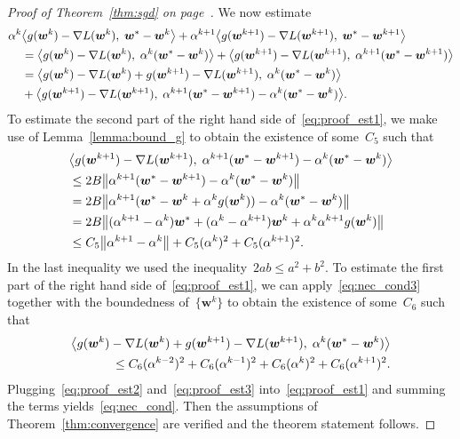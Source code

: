 \begin{proof}[Proof of Theorem~\ref{thm:sgd} on page~\pageref{thm:sgd}]
  We now estimate
  \begin{equation}\label{eq:proof_est1}
    \begin{aligned}
      \alpha^k
      & \inner{ g(\bm{w}^{k})-\nabla L(\bm{w}^{k})}{\bm{w}^*-\bm{w}^{k}} + \alpha^{k+1}\inner{ g(\bm{w}^{k+1})-\nabla L(\bm{w}^{k+1})}{\bm{w}^*-\bm{w}^{k+1}} \\
      & = \inner{ g(\bm{w}^{k})-\nabla L(\bm{w}^{k})}{\alpha^k(\bm{w}^*-\bm{w}^{k})}
        + \inner{ g(\bm{w}^{k+1})-\nabla L(\bm{w}^{k+1})}{\alpha^{k+1}(\bm{w}^*-\bm{w}^{k+1})} \\
      & = \inner{ g(\bm{w}^{k})-\nabla L(\bm{w}^{k}) + g(\bm{w}^{k+1})-\nabla L(\bm{w}^{k+1})}{\alpha^k(\bm{w}^*-\bm{w}^{k})} \\
      & + \inner{ g(\bm{w}^{k+1})-\nabla L(\bm{w}^{k+1})}{\alpha^{k+1}(\bm{w}^*-\bm{w}^{k+1})-\alpha^k(\bm{w}^*-\bm{w}^{k})}.
    \end{aligned}
  \end{equation}
  To estimate the second part of the right hand side of~\eqref{eq:proof_est1}, we make use of Lemma~\ref{lemma:bound_g} to obtain the existence of some~$C_5$ such that
  \begin{equation}\label{eq:proof_est2}
    \begin{aligned}
    & \inner{ g(\bm{w}^{k+1})
    -\nabla L(\bm{w}^{k+1})}{\alpha^{k+1}(\bm{w}^*-\bm{w}^{k+1})-\alpha^k(\bm{w}^*-\bm{w}^{k})} \\
    & \leq 2B\norm{\alpha^{k+1}(\bm{w}^*-\bm{w}^{k+1})-\alpha^k(\bm{w}^*-\bm{w}^{k})} \\
    & = 2B\norm{\alpha^{k+1}(\bm{w}^*-\bm{w}^k+\alpha^kg(\bm{w}^k))-\alpha^k(\bm{w}^*-\bm{w}^{k})} \\
    & = 2B\norm{(\alpha^{k+1}-\alpha^k)\bm{w}^* + (\alpha^k-\alpha^{k+1})\bm{w}^k + \alpha^k\alpha^{k+1} g(\bm{w}^k)} \\
    & \leq C_5 \norm{\alpha^{k+1}-\alpha^k} + C_5(\alpha^k)^2 + C_5(\alpha^{k+1})^2.
    \end{aligned}
  \end{equation}
  In the last inequality we used the inequality~$2ab\leq a^2+b^2$. To estimate the first part of the right hand side of~\eqref{eq:proof_est1}, we can apply~\eqref{eq:nec_cond3} together with the boundedness of~$\{\bm{w}^k\}$ to obtain the existence of some~$C_6$ such that
  \begin{equation}\label{eq:proof_est3}
    \begin{aligned}
    \inner{ g(\bm{w}^{k}) -\nabla L(\bm{w}^{k}) + g(\bm{w}^{k+1})-\nabla L(\bm{w}^{k+1})}{\alpha^k(\bm{w}^* - \bm{w}^{k})} \\
      \leq C_6(\alpha^{k-2})^2 + C_6(\alpha^{k-1})^2 + C_6(\alpha^{k})^2 + C_6(\alpha^{k+1})^2.
      \end{aligned}
  \end{equation}
  Plugging~\eqref{eq:proof_est2} and~\eqref{eq:proof_est3} into~\eqref{eq:proof_est1} and summing the terms yields~\eqref{eq:nec_cond}. Then the assumptions of Theorem~\ref{thm:convergence} are verified and the theorem statement follows.
\end{proof}

